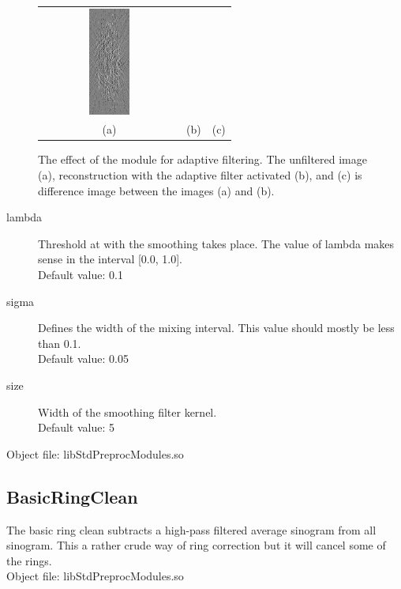 \documentclass[a4paper]{scrreprt}
\begin{document}
\begin{figure}[ht!]
\begin{tabular}{ccc}
\includegraphics[angle=90, width=0.3\textwidth]{figures/adaptive_diff.png} \\
(a) & (b) & (c)
\end{tabular}
\caption{The effect of the module for adaptive filtering. The unfiltered image (a), reconstruction with the adaptive filter activated (b), and (c) is difference image between the images (a) and (b).}
\end{figure}
\begin{description}
 \item[lambda] Threshold at with the smoothing takes place. The value of lambda makes sense in the interval [0.0, 1.0]. \\Default value: 0.1
  \item[sigma] Defines the width of the mixing interval. This value should mostly be less than 0.1. \\Default value: 0.05
 \item[size] Width of the smoothing filter kernel. \\Default value: 5
\end{description}
Object file: libStdPreprocModules.so

\subsection{BasicRingClean}
The basic ring clean subtracts a high-pass filtered average sinogram from all sinogram. This a rather crude way of ring correction but it will cancel some of the rings.\\
Object file: libStdPreprocModules.so
\end{document}
